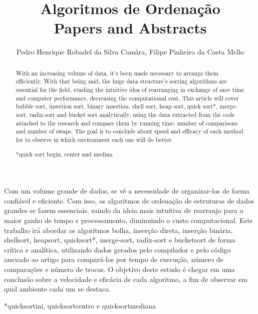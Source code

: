 \documentclass[12pt]{article}
\title{Algoritmos de Ordenação\\ Papers and Abstracts}
\author{Pedro Henrique Robadel da Silva Camâra\inst{1}, Filipe Pinheiro da Costa Mello\inst{1}}
\begin{document}
 

\maketitle

\begin{abstract}
  
 With an increasing volume of data, it's been made necessary to arrange them efficiently. With that being said, the huge data structure's sorting algorithms are essential for the field, evading the intuitive idea of rearranging in exchange of save time and computer performance, decreasing the computational cost.
 This article will cover bubble sort, insertion sort, binary insertion, shell sort, heap sort, quick sort*, merge-sort, radix-sort and bucket sort analytically, using the data extracted from the code attached to the research and compare them by running time, number of comparisons and number of swaps. The goal is to conclude about speed and efficacy of each method for to observe in which environment each one will do better.
 
 *quick sort begin, center and median
  
\end{abstract}
     
\begin{resumo} 
  
  Com um volume grande de dados, se vê a necessidade de organizar-los de forma confiável e eficiente. Com isso, os algoritmos de ordenação de estruturas de dados grandes se fazem essenciais, saindo da ideia mais intuitiva de rearranjo para o maior ganho de tempo e processamento, diminuindo o custo computacional. 
  Este trabalho irá abordar os algoritmos bolha, inserção direta, inserção binária, shellsort, heapsort, quicksort*, merge-sort, radix-sort e bucketsort de forma crítica e analítica, utilizando dados gerados pelo compilador e pelo código anexado ao artigo para compará-los por tempo de execução, número de comparações e número de trocas. O objetivo deste estudo é chegar em uma conclusão sobre a velocidade e eficácia de cada algoritmo, a fim de observar em qual ambiente cada um se destaca.

  *quicksortini, quicksortcentro e quicksortmediana
\end{resumo} 






\end{document}
